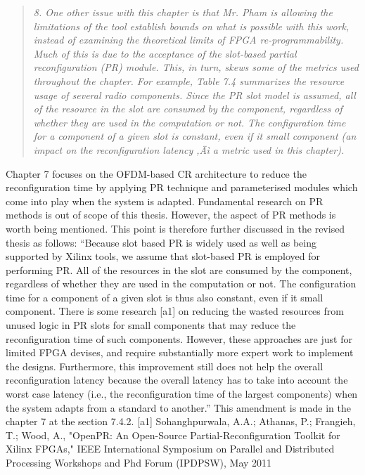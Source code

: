 \documentclass{article}
\begin{document}
\begin{quote}
\emph{8. One other issue with this chapter is that Mr. Pham is allowing the limitations of the tool establish bounds on what is possible with this work, instead of examining the theoretical limits of FPGA re-programmability. Much of this is due to the acceptance of the slot-based partial reconfiguration (PR) module. This, in turn, skews some of the metrics used throughout the chapter. For example, Table 7.4 summarizes the resource usage of several radio components. Since the PR slot model is assumed, all of the resource in the slot are consumed by the component, regardless of whether they are used in the computation or not. The configuration time for a component of a given slot is constant, even if it small component (an impact on the reconfiguration latency ‚Äì a metric used in this chapter).}
\end{quote}
Chapter 7 focuses on the OFDM-based CR architecture to reduce the reconfiguration time by applying PR technique and parameterised modules which come into play when the system is adapted. Fundamental research on PR methods is out of scope of this thesis. However, the aspect of PR methods is worth being mentioned. This point is therefore further discussed in the revised thesis as follows:
``Because slot based PR is widely used as well as being supported by Xilinx tools, we assume that slot-based PR is employed for performing PR.
All of the resources in the slot are consumed by the component, regardless of whether they are used in the computation or not. The configuration time for a component of a given slot is thus also constant, even if it small component.
There is some research [a1] on reducing the wasted resources from unused logic in PR slots for small components that may reduce the reconfiguration time of such components. However, these approaches are just for limited FPGA devises, and require substantially more expert work to implement the designs.
Furthermore, this improvement still does not help the overall reconfiguration latency because the overall latency has to take into account the worst case latency (i.e., the reconfiguration time of the largest components) when the system adapts from a standard to another.''
This amendment is made in the chapter 7 at the section 7.4.2.
[a1]  Sohanghpurwala, A.A.; Athanas, P.; Frangieh, T.; Wood, A., "OpenPR: An Open-Source Partial-Reconfiguration Toolkit for Xilinx FPGAs," IEEE International Symposium on Parallel and Distributed Processing Workshops and Phd Forum (IPDPSW), May 2011
\end{document}
